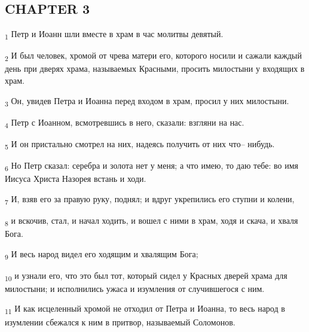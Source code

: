\subsection{CHAPTER 3}
\begin{tcolorbox}
\textsubscript{1} Петр и Иоанн шли вместе в храм в час молитвы девятый.
\end{tcolorbox}
\begin{tcolorbox}
\textsubscript{2} И был человек, хромой от чрева матери его, которого носили и сажали каждый день при дверях храма, называемых Красными, просить милостыни у входящих в храм.
\end{tcolorbox}
\begin{tcolorbox}
\textsubscript{3} Он, увидев Петра и Иоанна перед входом в храм, просил у них милостыни.
\end{tcolorbox}
\begin{tcolorbox}
\textsubscript{4} Петр с Иоанном, всмотревшись в него, сказали: взгляни на нас.
\end{tcolorbox}
\begin{tcolorbox}
\textsubscript{5} И он пристально смотрел на них, надеясь получить от них что-- нибудь.
\end{tcolorbox}
\begin{tcolorbox}
\textsubscript{6} Но Петр сказал: серебра и золота нет у меня; а что имею, то даю тебе: во имя Иисуса Христа Назорея встань и ходи.
\end{tcolorbox}
\begin{tcolorbox}
\textsubscript{7} И, взяв его за правую руку, поднял; и вдруг укрепились его ступни и колени,
\end{tcolorbox}
\begin{tcolorbox}
\textsubscript{8} и вскочив, стал, и начал ходить, и вошел с ними в храм, ходя и скача, и хваля Бога.
\end{tcolorbox}
\begin{tcolorbox}
\textsubscript{9} И весь народ видел его ходящим и хвалящим Бога;
\end{tcolorbox}
\begin{tcolorbox}
\textsubscript{10} и узнали его, что это был тот, который сидел у Красных дверей храма для милостыни; и исполнились ужаса и изумления от случившегося с ним.
\end{tcolorbox}
\begin{tcolorbox}
\textsubscript{11} И как исцеленный хромой не отходил от Петра и Иоанна, то весь народ в изумлении сбежался к ним в притвор, называемый Соломонов.
\end{tcolorbox}

